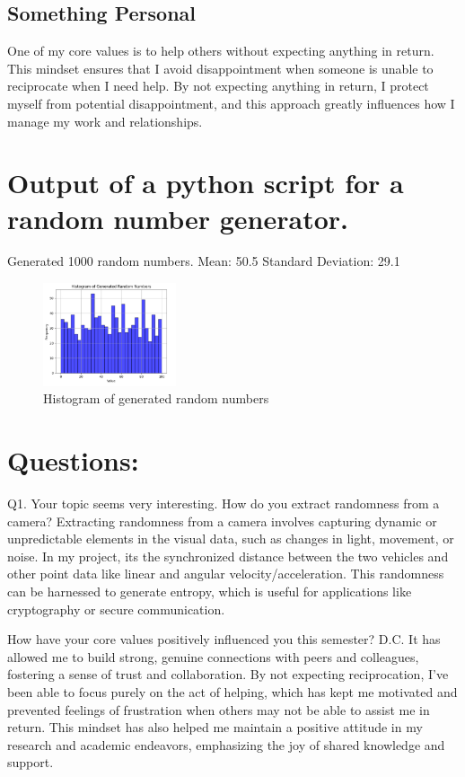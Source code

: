 \documentclass{article}
\begin{document}
\subsection {Something Personal}
One of my core values is to help others without expecting anything in return. This mindset ensures that I avoid disappointment when someone is unable to reciprocate when I need help. By not expecting anything in return, I protect myself from potential disappointment, and this approach greatly influences how I manage my work and relationships.

\section{Output of a python script for a random number generator.}
Generated 1000 random numbers.
Mean: 50.5
Standard Deviation: 29.1
\begin{figure}[ht]
    \centering
    \includegraphics[width=0.35\textwidth]{images/rannumgen.jpg}
    \caption{Histogram of generated random numbers}
    \label{fig: rannumgen.jpg}
\end{figure}


\section*{Questions: }

Q1. Your topic seems very interesting. How do you extract randomness from a camera?
Extracting randomness from a camera involves capturing dynamic or unpredictable elements in the visual data, such as changes in light, movement, or noise. In my project, its the synchronized distance between the two vehicles and other point data like linear and angular velocity/acceleration. This randomness can be harnessed to generate entropy, which is useful for applications like cryptography or secure communication.

How have your core values positively influenced you this semester? D.C.
It has allowed me to build strong, genuine connections with peers and colleagues, fostering a sense of trust and collaboration. By not expecting reciprocation, I’ve been able to focus purely on the act of helping, which has kept me motivated and prevented feelings of frustration when others may not be able to assist me in return. This mindset has also helped me maintain a positive attitude in my research and academic endeavors, emphasizing the joy of shared knowledge and support.
\end{document}
